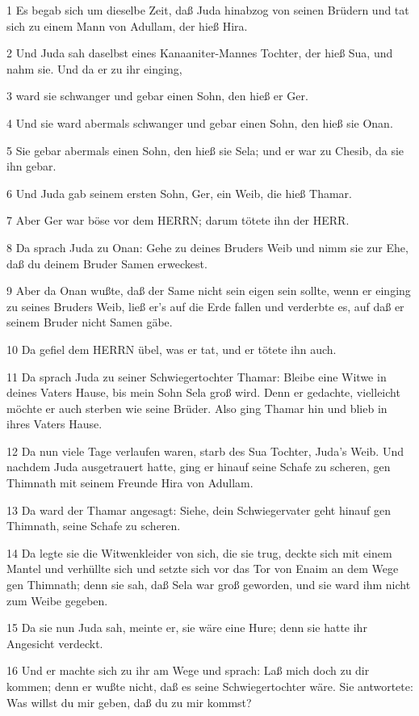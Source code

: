 \par 1 Es begab sich um dieselbe Zeit, daß Juda hinabzog von seinen Brüdern und tat sich zu einem Mann von Adullam, der hieß Hira.
\par 2 Und Juda sah daselbst eines Kanaaniter-Mannes Tochter, der hieß Sua, und nahm sie. Und da er zu ihr einging,
\par 3 ward sie schwanger und gebar einen Sohn, den hieß er Ger.
\par 4 Und sie ward abermals schwanger und gebar einen Sohn, den hieß sie Onan.
\par 5 Sie gebar abermals einen Sohn, den hieß sie Sela; und er war zu Chesib, da sie ihn gebar.
\par 6 Und Juda gab seinem ersten Sohn, Ger, ein Weib, die hieß Thamar.
\par 7 Aber Ger war böse vor dem HERRN; darum tötete ihn der HERR.
\par 8 Da sprach Juda zu Onan: Gehe zu deines Bruders Weib und nimm sie zur Ehe, daß du deinem Bruder Samen erweckest.
\par 9 Aber da Onan wußte, daß der Same nicht sein eigen sein sollte, wenn er einging zu seines Bruders Weib, ließ er's auf die Erde fallen und verderbte es, auf daß er seinem Bruder nicht Samen gäbe.
\par 10 Da gefiel dem HERRN übel, was er tat, und er tötete ihn auch.
\par 11 Da sprach Juda zu seiner Schwiegertochter Thamar: Bleibe eine Witwe in deines Vaters Hause, bis mein Sohn Sela groß wird. Denn er gedachte, vielleicht möchte er auch sterben wie seine Brüder. Also ging Thamar hin und blieb in ihres Vaters Hause.
\par 12 Da nun viele Tage verlaufen waren, starb des Sua Tochter, Juda's Weib. Und nachdem Juda ausgetrauert hatte, ging er hinauf seine Schafe zu scheren, gen Thimnath mit seinem Freunde Hira von Adullam.
\par 13 Da ward der Thamar angesagt: Siehe, dein Schwiegervater geht hinauf gen Thimnath, seine Schafe zu scheren.
\par 14 Da legte sie die Witwenkleider von sich, die sie trug, deckte sich mit einem Mantel und verhüllte sich und setzte sich vor das Tor von Enaim an dem Wege gen Thimnath; denn sie sah, daß Sela war groß geworden, und sie ward ihm nicht zum Weibe gegeben.
\par 15 Da sie nun Juda sah, meinte er, sie wäre eine Hure; denn sie hatte ihr Angesicht verdeckt.
\par 16 Und er machte sich zu ihr am Wege und sprach: Laß mich doch zu dir kommen; denn er wußte nicht, daß es seine Schwiegertochter wäre. Sie antwortete: Was willst du mir geben, daß du zu mir kommst?
